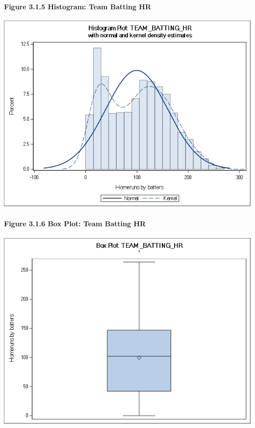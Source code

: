 \documentclass[]{article}
\let\oldparagraph\paragraph
\renewcommand{\paragraph}[1]{\oldparagraph{#1}\mbox{}}
\begin{document}
\newpage

\paragraph{Figure 3.1.5 Histogram: Team Batting
HR}\label{figure-3.1.5-histogram-team-batting-hr}

\includegraphics[height=3.95833in]{images/hist_team_batting_hr.png}

\paragraph{Figure 3.1.6 Box Plot: Team Batting
HR}\label{figure-3.1.6-box-plot-team-batting-hr}

\includegraphics[height=3.95833in]{images/box_team_batting_hr.png}
\end{document}
